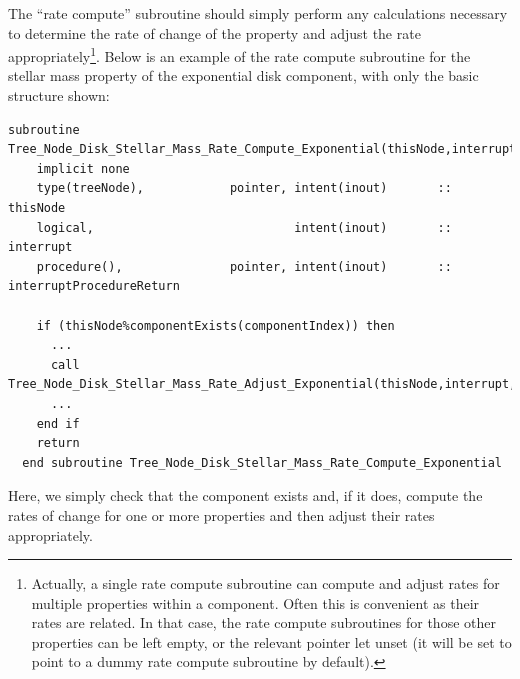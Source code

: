The ``rate compute'' subroutine should simply perform any calculations necessary to determine the rate of change of the property and adjust the rate appropriately\footnote{Actually, a single rate compute subroutine can compute and adjust rates for multiple properties within a component. Often this is convenient as their rates are related. In that case, the rate compute subroutines for those other properties can be left empty, or the relevant pointer let unset (it will be set to point to a dummy rate compute subroutine by default).}. Below is an example of the rate compute subroutine for the stellar mass property of the exponential disk component, with only the basic structure shown:
\begin{lstlisting}[escapechar=@,breaklines,prebreak=\&,postbreak=\&]
  subroutine Tree_Node_Disk_Stellar_Mass_Rate_Compute_Exponential(thisNode,interrupt,interruptProcedureReturn)
    implicit none
    type(treeNode),            pointer, intent(inout)       :: thisNode
    logical,                            intent(inout)       :: interrupt
    procedure(),               pointer, intent(inout)       :: interruptProcedureReturn
 
    if (thisNode%componentExists(componentIndex)) then
      ...
      call Tree_Node_Disk_Stellar_Mass_Rate_Adjust_Exponential(thisNode,interrupt,interruptProcedure,stellarMassRate)
      ...
    end if
    return
  end subroutine Tree_Node_Disk_Stellar_Mass_Rate_Compute_Exponential
\end{lstlisting}
Here, we simply check that the component exists and, if it does, compute the rates of change for one or more properties and then adjust their rates appropriately.

